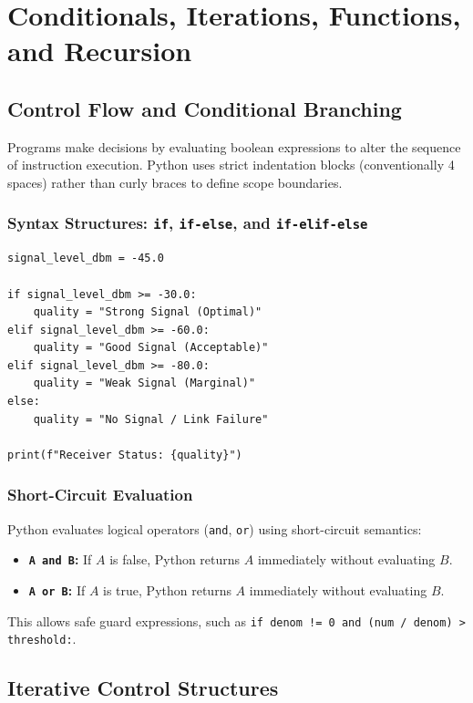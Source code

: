 \chapter{Conditionals, Iterations, Functions, and Recursion}
\label{ch:control_functions}

\section{Control Flow and Conditional Branching}

Programs make decisions by evaluating boolean expressions to alter the sequence of instruction execution. Python uses strict indentation blocks (conventionally 4 spaces) rather than curly braces to define scope boundaries.

\subsection{Syntax Structures: \texttt{if}, \texttt{if-else}, and \texttt{if-elif-else}}
\begin{lstlisting}[caption={Multi-way Signal Classification}]
signal_level_dbm = -45.0

if signal_level_dbm >= -30.0:
    quality = "Strong Signal (Optimal)"
elif signal_level_dbm >= -60.0:
    quality = "Good Signal (Acceptable)"
elif signal_level_dbm >= -80.0:
    quality = "Weak Signal (Marginal)"
else:
    quality = "No Signal / Link Failure"

print(f"Receiver Status: {quality}")
\end{lstlisting}

\subsection{Short-Circuit Evaluation}
Python evaluates logical operators (\texttt{and}, \texttt{or}) using short-circuit semantics:
\begin{itemize}[leftmargin=1.8em, itemsep=2pt]
    \item \textbf{\texttt{A and B}:} If $A$ is false, Python returns $A$ immediately without evaluating $B$.
    \item \textbf{\texttt{A or B}:} If $A$ is true, Python returns $A$ immediately without evaluating $B$.
\end{itemize}
This allows safe guard expressions, such as \texttt{if denom != 0 and (num / denom) > threshold:}.

\section{Iterative Control Structures}

